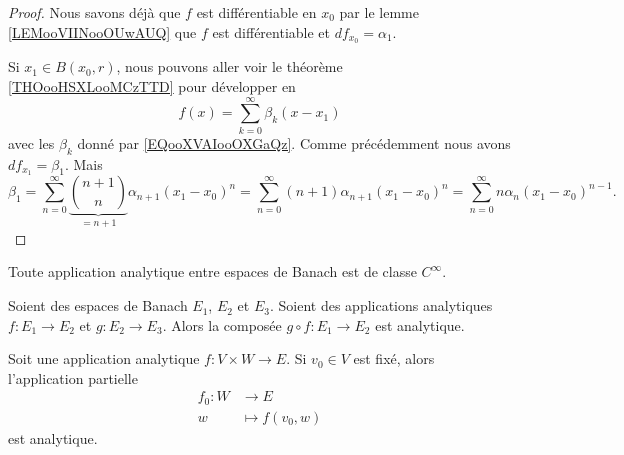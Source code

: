 \begin{proof}
	Nous savons déjà que \( f\) est différentiable en \( x_0\) par le lemme \ref{LEMooVIINooOUwAUQ} que \( f\) est différentiable et \( df_{x_0}=\alpha_1\).

	Si \( x_1\in B(x_0,r)\), nous pouvons aller voir le théorème \ref{THOooHSXLooMCzTTD} pour développer en
	\begin{equation}
		f(x)=\sum_{k=0}^{\infty}\beta_k(x-x_1)
	\end{equation}
	avec les \( \beta_k\) donné par \eqref{EQooXVAIooOXGaQz}. Comme précédemment nous avons \( df_{x_1}=\beta_1\). Mais
	\begin{equation}
		\beta_1=\sum_{n=0}^{\infty}\underbrace{\binom{ n+1 }{ n }}_{=n+1}\alpha_{n+1}(x_1-x_0)^n=\sum_{n=0}^{\infty}(n+1)\alpha_{n+1}(x_1-x_0)^n=\sum_{n=0}^{\infty}n\alpha_n(x_1-x_0)^{n-1}.
	\end{equation}
\end{proof}


\begin{proposition}	\label{PROPooGMWRooPIzwus}
	Toute application analytique entre espaces de Banach est de classe \( C^{\infty}\).
\end{proposition}


\begin{proposition}	\label{PROPooXKHBooQvvNmN}
	Soient des espaces de Banach \( E_1\), \( E_2\) et \( E_3\). Soient des applications analytiques \(f \colon E_1\to E_2  \) et \(g \colon E_2\to E_3  \). Alors la composée \(g\circ f \colon E_1 \to E_2  \) est analytique.
\end{proposition}

\begin{proposition}	\label{PROPooKHAYooCxMgep}
	Soit une application analytique \(f \colon V\times W\to  E \). Si \( v_0\in V\) est fixé, alors l'application partielle
	\begin{equation}
		\begin{aligned}
			f_0\colon W & \to E            \\
			w           & \mapsto f(v_0,w)
		\end{aligned}
	\end{equation}
	est analytique.
\end{proposition}


